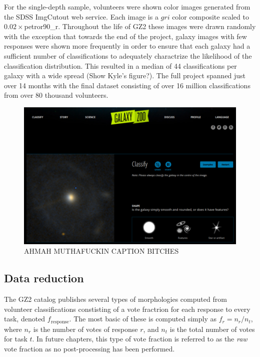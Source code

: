 For the single-depth sample, volunteers were shown color images generated from the SDSS ImgCutout web service. Each image is a $gri$ color composite scaled to $0.02\times$petror90\_r. Throughout the life of GZ2 these images were drawn randomly with the exception that towards the end of the project, galaxy images with few responses were shown more frequently in order to ensure that each galaxy had a sufficient number of classifications to adequately charactrize the likelihood of the classification distribution. This resulted in a median of 44 classifications per galaxy with a wide spread (Show Kyle's figure?). The full project spanned just over 14 months with the final dataset consisting of over 16 million classifications from over 80 thousand volunteers. 
 
\begin{figure}[h!]
\includegraphics[width=\textwidth]{Figures/GZ2interface.pdf}
\caption{AHMAH MUTHAFUCKIN CAPTION BITCHES}
\label{fig: gz2 interface}
\end{figure}

\subsection{Data reduction}
The GZ2 catalog publishes several types of morphologies computed from volunteer classifications constisting of a vote fractrion for each response to every task, denoted $f_{\mathrm{response}}$. The most basic of these is computed simply as $f_r = n_r/n_t$, where $n_r$ is the number of votes of response $r$, and $n_t$ is the total number of votes for task $t$. In future chapters, this type of vote fraction is referred to as the \textit{raw} vote fraction as no post-processing has been performed. 

